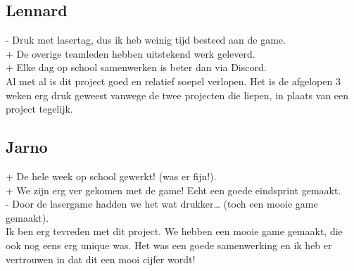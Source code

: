 \documentclass{article}
\begin{document}
\subsection{Lennard} %
\label{sub:lennard}
- Druk met lasertag, dus ik heb weinig tijd besteed aan de game.\\
+ De overige teamleden hebben uitstekend werk geleverd.\\
+ Elke dag op school samenwerken is beter dan via Discord.\\
Al met al is dit project goed en relatief soepel verlopen. Het is de afgelopen 3 weken erg druk geweest vanwege de twee projecten die liepen, in plaats van een project tegelijk.

\subsection{Jarno} %
\label{sub:jarno}
+ De hele week op school gewerkt! (was er fijn!).\\
+ We zijn erg ver gekomen met de game! Echt een goede eindsprint gemaakt.\\
- Door de lasergame hadden we het wat drukker… (toch een mooie game gemaakt).\\
Ik ben erg tevreden met dit project. We hebben een mooie game gemaakt, die ook nog eens erg unique was. Het was een goede samenwerking en ik heb er vertrouwen in dat dit een mooi cijfer wordt!
\end{document}
